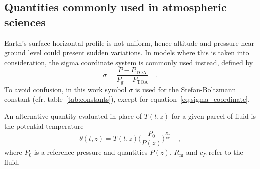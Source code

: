 \documentclass[a4paper,10pt,twocolumn,\classoptions]{article}
\newcommand{\PTOA}{P_\text{TOA}}
\begin{document}
\subsection{Quantities commonly used in atmospheric sciences}
\label{sec:Quantities commonly used in atmospheric sciences}
Earth's surface horizontal profile is not uniform, hence altitude and pressure near ground level could present sudden variations. In models where this is taken into consideration, the sigma coordinate system is commonly used instead, defined by
\begin{equation}
  \label{eq:sigma_coordinate}
  \sigma = \frac{P - \PTOA}{P_\text{g} - \PTOA}
  \quad .
\end{equation}
To avoid confusion, in this work symbol $\sigma$ is used for the Stefan-Boltzmann constant (cfr. table~\ref{tab:constants}), except for equation~\eqref{eq:sigma_coordinate}.

An alternative quantity evaluated in place of $T(t,z)$ for a given parcel of fluid is the potential temperature
\begin{equation}
  \label{eq:potential_temperature}
  \theta(t,z) = T(t,z) \bigg( \frac{P_0}{P(z)} \bigg)^\frac{R_\text{m}}{c_P}
  \quad ,
\end{equation}
where $P_0$ is a reference pressure and quantities $P(z)$, $R_\text{m}$ and $c_P$ refer to the fluid.



\newpage
\printbibliography[heading=bibintoc]
\end{document}
